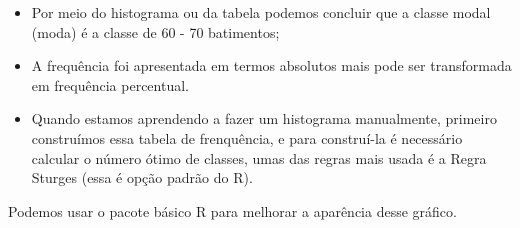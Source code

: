 \documentclass[
]{book}
\newenvironment{Shaded}{\begin{snugshade}}{\end{snugshade}}
\newcommand{\AttributeTok}[1]{\textcolor[rgb]{0.13,0.29,0.53}{#1}}
\newcommand{\CommentTok}[1]{\textcolor[rgb]{0.56,0.35,0.01}{\textit{#1}}}
\newcommand{\DecValTok}[1]{\textcolor[rgb]{0.00,0.00,0.81}{#1}}
\newcommand{\FloatTok}[1]{\textcolor[rgb]{0.00,0.00,0.81}{#1}}
\newcommand{\FunctionTok}[1]{\textcolor[rgb]{0.13,0.29,0.53}{\textbf{#1}}}
\newcommand{\NormalTok}[1]{#1}
\newcommand{\OtherTok}[1]{\textcolor[rgb]{0.56,0.35,0.01}{#1}}
\newcommand{\SpecialCharTok}[1]{\textcolor[rgb]{0.81,0.36,0.00}{\textbf{#1}}}
\newcommand{\StringTok}[1]{\textcolor[rgb]{0.31,0.60,0.02}{#1}}
\begin{document}
\begin{itemize}
\item
  Por meio do histograma ou da tabela podemos concluir que a classe modal (moda) é a classe de 60 - 70 batimentos;
\item
  A frequência foi apresentada em termos absolutos mais pode ser transformada em frequência percentual.
\item
  Quando estamos aprendendo a fazer um histograma manualmente, primeiro construímos essa tabela de frenquência, e para construí-la é necessário calcular o número ótimo de classes, umas das regras mais usada é a Regra Sturges (essa é opção padrão do R).
\end{itemize}

Podemos usar o pacote básico R para melhorar a aparência desse gráfico.

\begin{Shaded}
\end{Shaded}
\end{document}
